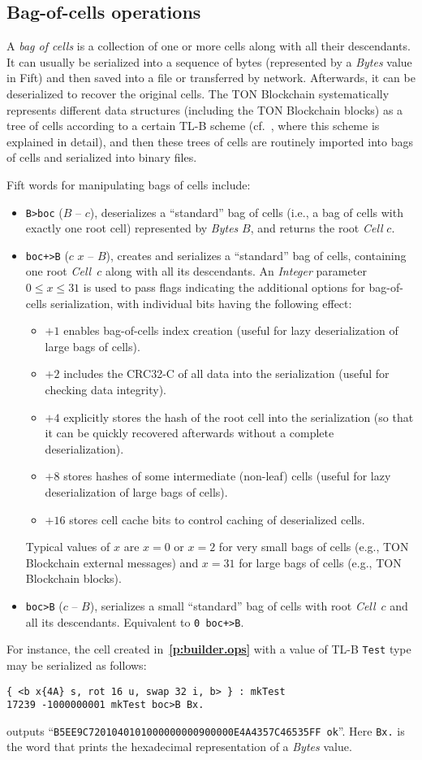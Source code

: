 \documentclass[12pt,oneside]{article}
\def\refpoint#1{{\rm\textbf{\ref{#1}}}}
\let\ptref=\refpoint
\def\mysubsection#1{\subsection{#1}\fancyhead[C]{\small{\textsc{\textrm{\thesubsection.} #1}}}}
\begin{document}
\mysubsection{Bag-of-cells operations}\label{p:boc.ops}
A {\em bag of cells\/} is a collection of one or more cells along with all their descendants. It can usually be serialized into a sequence of bytes (represented by a {\em Bytes\/} value in Fift) and then saved into a file or transferred by network. Afterwards, it can be deserialized to recover the original cells. The TON Blockchain systematically represents different data structures (including the TON Blockchain blocks) as a tree of cells according to a certain TL-B scheme (cf.~\cite{TBC}, where this scheme is explained in detail), and then these trees of cells are routinely imported into bags of cells and serialized into binary files.

Fift words for manipulating bags of cells include:
\begin{itemize}
\item {\tt B>boc} ($B$ -- $c$), deserializes a ``standard'' bag of cells (i.e., a bag of cells with exactly one root cell) represented by {\em Bytes} $B$, and returns the root {\em Cell\/} $c$.
\item {\tt boc+>B} ($c$ $x$ -- $B$), creates and serializes a ``standard'' bag of cells, containing one root {\em Cell\/}~$c$ along with all its descendants. An {\em Integer\/} parameter $0\leq x\leq 31$ is used to pass flags indicating the additional options for bag-of-cells serialization, with individual bits having the following effect:
  \begin{itemize}
  \item $+1$ enables bag-of-cells index creation (useful for lazy deserialization of large bags of cells).
  \item $+2$ includes the CRC32-C of all data into the serialization (useful for checking data integrity).
  \item $+4$ explicitly stores the hash of the root cell into the serialization (so that it can be quickly recovered afterwards without a complete deserialization).
  \item $+8$ stores hashes of some intermediate (non-leaf) cells (useful for lazy deserialization of large bags of cells).
  \item $+16$ stores cell cache bits to control caching of deserialized cells.
  \end{itemize}
Typical values of $x$ are $x=0$ or $x=2$ for very small bags of cells (e.g., TON Blockchain external messages) and $x=31$ for large bags of cells (e.g., TON Blockchain blocks).
\item {\tt boc>B} ($c$ -- $B$), serializes a small ``standard'' bag of cells with root {\em Cell\/}~$c$ and all its descendants. Equivalent to {\tt 0 boc+>B}.
\end{itemize}
For instance, the cell created in~\ptref{p:builder.ops} with a value of TL-B {\tt Test} type may be serialized as follows:
\begin{verbatim}
{ <b x{4A} s, rot 16 u, swap 32 i, b> } : mkTest
17239 -1000000001 mkTest boc>B Bx.
\end{verbatim}
outputs ``{\tt B5EE9C7201040101000000000900000E4A4357C46535FF ok}''. Here {\tt Bx.} is the word that prints the hexadecimal representation of a {\em Bytes} value.
\end{document}

